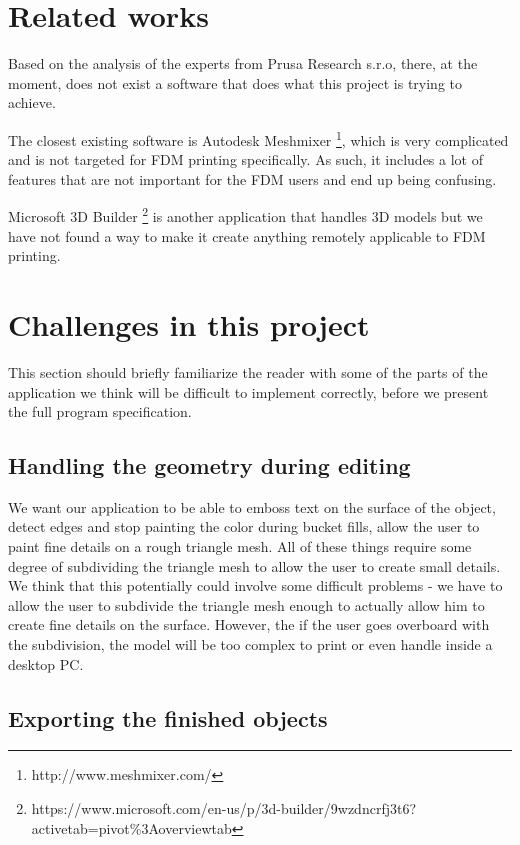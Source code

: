 \section{Related works}

Based on the analysis of the experts from Prusa Research s.r.o, there, at the moment, does not exist a software that does what this project is trying to achieve.

The closest existing software is Autodesk Meshmixer \footnote{http://www.meshmixer.com/}, which is very complicated and is not targeted for FDM printing specifically. As such, it includes a lot of features that are not important for the FDM users and end up being confusing.

Microsoft 3D Builder \footnote{https://www.microsoft.com/en-us/p/3d-builder/9wzdncrfj3t6?activetab=pivot\%3Aoverviewtab} is another application that handles 3D models but we have not found a way to make it create anything remotely applicable to FDM printing.

\section{Challenges in this project}

This section should briefly familiarize the reader with some of the parts of the application we think will be difficult to implement correctly, before we present the full program specification.

\subsection{Handling the geometry during editing}

We want our application to be able to emboss text on the surface of the object, detect edges and stop painting the color during bucket fills, allow the user to paint fine details on a rough triangle mesh. All of these things require some degree of subdividing the triangle mesh to allow the user to create small details. We think that this potentially could involve some difficult problems - we have to allow the user to subdivide the triangle mesh enough to actually allow him to create fine details on the surface. However, the if the user goes overboard with the subdivision, the model will be too complex to print or even handle inside a desktop PC.

\subsection{Exporting the finished objects}

